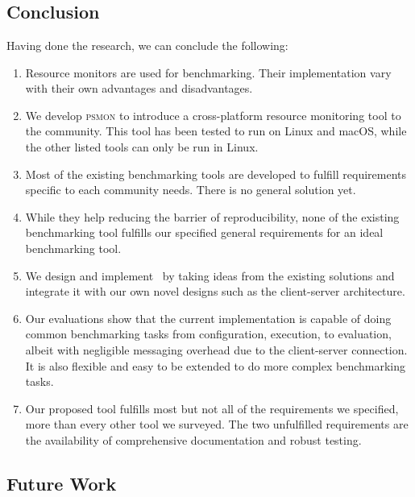 \fancyhead[LE,RO]{\thepage}

\chapter{\chConclusion}
\label{ch:conclusion}



\section{Conclusion}

Having done the research, we can conclude the following:

\begin{enumerate}
    \item Resource monitors are used for benchmarking. Their implementation vary with their own advantages and disadvantages.
    \item We develop \textsc{psmon} to introduce a cross-platform resource monitoring tool to the community. This tool has been tested to run on Linux and macOS, while the other listed tools can only be run in Linux.
    \item Most of the existing benchmarking tools are developed to fulfill requirements specific to each community needs. There is no general solution yet.
    \item While they help reducing the barrier of reproducibility, none of the existing benchmarking tool fulfills our specified general requirements for an ideal benchmarking tool.
    \item We design and implement \OurBenchmarkingTool~by taking ideas from the existing solutions and integrate it with our own novel designs such as the client-server architecture.
    \item Our evaluations show that the current implementation is capable of doing common benchmarking tasks from configuration, execution, to evaluation, albeit with negligible messaging overhead due to the client-server connection. It is also flexible and easy to be extended to do more complex benchmarking tasks.
    \item Our proposed tool fulfills most but not all of the requirements we specified, more than every other tool we surveyed. The two unfulfilled requirements are the availability of comprehensive documentation and robust testing.
\end{enumerate}

\section{Future Work}


